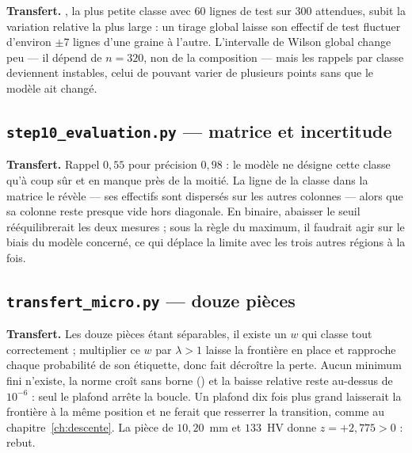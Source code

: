 

\textbf{Transfert.} \Slyth, la plus petite classe avec $60$ lignes de test sur
$300$ attendues, subit la variation relative la plus large : un tirage global
laisse son effectif de test fluctuer d'environ $\pm7$ lignes d'une graine à
l'autre. L'intervalle de Wilson global change peu --- il dépend de $n=320$, non
de la composition --- mais les rappels par classe deviennent instables, celui de
\Slyth pouvant varier de plusieurs points sans que le modèle ait changé.

\subsection*{\texttt{step10\_evaluation.py} --- matrice et incertitude}


\textbf{Transfert.} Rappel $0{,}55$ pour précision $0{,}98$ : le modèle ne
désigne cette classe qu'à coup sûr et en manque près de la moitié. La ligne de
la classe dans la matrice le révèle --- ses effectifs sont dispersés sur les
autres colonnes --- alors que sa colonne reste presque vide hors diagonale. En
binaire, abaisser le seuil rééquilibrerait les deux mesures ; sous la règle du
maximum, il faudrait agir sur le biais du modèle concerné, ce qui déplace la
limite avec les trois autres régions à la fois.

\subsection*{\texttt{transfert\_micro.py} --- douze pièces}


\textbf{Transfert.} Les douze pièces étant séparables, il existe un $w$ qui
classe tout correctement ; multiplier ce $w$ par $\lambda>1$ laisse la frontière
en place et rapproche chaque probabilité de son étiquette, donc fait décroître la
perte. Aucun minimum fini n'existe, la norme croît sans borne
() et la baisse relative reste au-dessus de $10^{-6}$ :
seul le plafond arrête la boucle. Un plafond dix fois plus grand laisserait la
frontière à la même position et ne ferait que resserrer la transition, comme au
chapitre~\ref{ch:descente}. La pièce de $10{,}20$~mm et $133$~HV donne
$z=+2{,}775>0$ : rebut.

